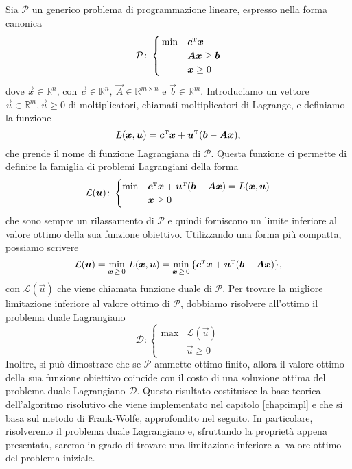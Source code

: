 Sia $\mathcal{P}$ un generico problema di programmazione lineare, espresso
nella forma canonica
\begin{equation}
    \mathcal{P}\colon
    \begin{cases}
        \,\min & \bm{c}^{\scriptscriptstyle\mathrm{T}} \bm{x} \\
               & \bm{A} \bm{x} \ge \bm{b} \\
             & \bm{x} \ge 0
    \end{cases}
\end{equation}
dove $\vec{x} \in \mathbb{R}^n$, con $\vec{c} \in \mathbb{R}^n,\ \vec{A}
\in \mathbb{R}^{m \times n}$ e $\vec{b} \in \mathbb{R}^m$. Introduciamo un vettore \( \vec{u} \in \mathbb{R}^m, \vec{u}
\geq 0\) di moltiplicatori, chiamati moltiplicatori di Lagrange, e definiamo la funzione
\begin{equation}
    L(\bm{x}, \bm{u}) = \bm{c}^{\scriptscriptstyle\mathrm{T}} \bm{x} + \bm{u}^{\scriptscriptstyle\mathrm{T}}(\bm{b} - \bm{A}\bm{x}),
\end{equation}
che prende il nome di funzione Lagrangiana di \( \mathcal{P} \). Questa funzione ci permette di definire la famiglia di
problemi Lagrangiani della forma
\begin{equation}
    \mathcal{L}(\bm{u})\colon
    \begin{cases}
        \min & \bm{c}^{\scriptscriptstyle\mathrm{T}} \bm{x} + \bm{u}^{\scriptscriptstyle\mathrm{T}}(\bm{b} - \bm{A}\bm{x}) = L(\bm{x}, \bm{u})\\
             & \bm{x} \geq 0
    \end{cases}
\end{equation}
che sono sempre un rilassamento di \( \mathcal{P} \) e quindi forniscono un limite inferiore al valore ottimo della sua
funzione obiettivo. Utilizzando una forma più compatta, possiamo scrivere
\begin{equation}
    \mathcal{L}(\bm{u}) = \min_{\bm{x} \,\geq\, 0} \,L(\bm{x}, \bm{u}) = \min_{\bm{x} \,\geq\, 0}\,\{\bm{c}^{\scriptscriptstyle\mathrm{T}}
    \bm{x} + \bm{u}^{\scriptscriptstyle\mathrm{T}}(\bm{b} - \bm{A}\bm{x}) \},
\end{equation}
con \( \mathcal{L}(\vec{u}) \) che viene chiamata funzione duale di \( \mathcal{P} \). Per trovare la migliore
limitazione inferiore al valore ottimo di \( \mathcal{P} \), dobbiamo risolvere all'ottimo il problema duale Lagrangiano
\begin{equation}
    \mathcal{D}\colon
    \begin{cases}
        \max & \mathcal{L}(\vec{u}) \\
             & \vec{u} \geq 0
    \end{cases}
\end{equation}
Inoltre, si può dimostrare che se \( \mathcal{P} \) ammette ottimo finito, allora il valore ottimo della sua funzione
obiettivo coincide con il costo di una soluzione ottima del problema duale Lagrangiano \( \mathcal{D} \). Questo
risultato costituisce la base teorica dell'algoritmo risolutivo che viene implementato nel capitolo \ref{chap:impl} e
che si basa sul metodo di Frank-Wolfe, approfondito nel seguito. In particolare, risolveremo il problema duale
Lagrangiano e, sfruttando la proprietà appena presentata, saremo in grado di trovare una limitazione inferiore al valore
ottimo del problema iniziale.

